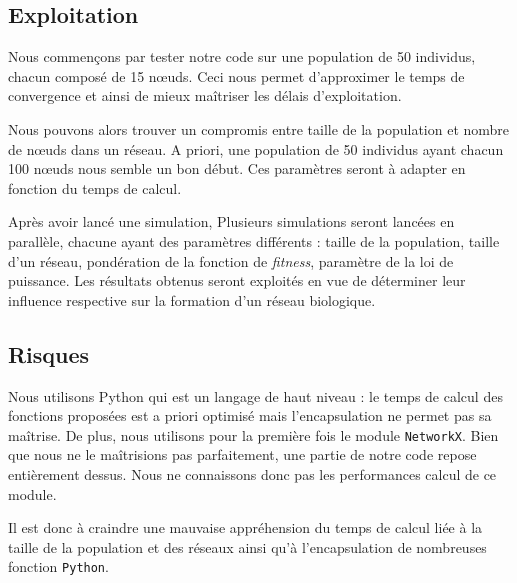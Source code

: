 \subsection{Exploitation}
Nous commençons par tester notre code sur une population de 50 individus, chacun composé de 15 nœuds. Ceci nous permet d'approximer le temps de convergence et ainsi de mieux ma\^itriser les délais d'exploitation.

Nous pouvons alors trouver un compromis entre taille de la population et nombre de nœuds dans un réseau. A priori, une population de 50 individus ayant chacun 100 nœuds nous semble un bon début. Ces paramètres seront à adapter en fonction du temps de calcul.

Après avoir lancé une simulation, Plusieurs simulations seront lancées en parallèle, chacune ayant des paramètres différents : taille de la population, taille d'un réseau, pondération de la fonction de \textit{fitness}, paramètre de la loi de puissance. Les résultats obtenus seront exploités en vue de déterminer leur influence respective sur la formation d'un réseau biologique.

\subsection{Risques}
Nous utilisons Python qui est un langage de haut niveau : le temps de calcul des fonctions proposées est a priori optimisé mais l'encapsulation ne permet pas sa maîtrise. De plus, nous utilisons pour la première fois le module \verb?NetworkX?. Bien que nous ne le ma\^itrisions pas parfaitement, une partie de notre code repose entièrement dessus. Nous ne connaissons donc pas les performances calcul de ce module.

Il est donc à craindre une mauvaise appréhension du temps de calcul liée à la taille de la population et des réseaux ainsi qu'à l'encapsulation de nombreuses fonction \verb?Python?.



